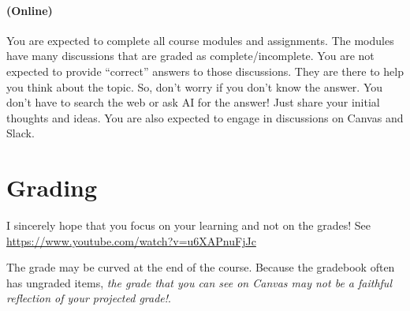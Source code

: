 \documentclass[11pt,article,oneside]{memoir} %
\begin{document}


\paragraph{(Online)} You are expected to complete all course modules and assignments. 
The modules have many discussions that are graded as complete/incomplete. You are not expected to provide ``correct'' answers to those discussions. They are there to help you think about the topic. 
So, don't worry if you don't know the answer. You don't have to search the web or ask AI for the answer! Just share your initial thoughts and ideas. 
You are also expected to engage in discussions on Canvas and Slack. 

\section{Grading}\label{sec:grading_tentative_}%

I sincerely hope that you focus on your learning and not on the grades! See \url{https://www.youtube.com/watch?v=u6XAPnuFjJc} 

The grade may be curved at the end of the course. Because the gradebook often has ungraded items, \emph{the grade that you can see on Canvas may not be a faithful reflection of your projected grade!}. 
\end{document}
